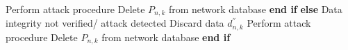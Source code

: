 \documentclass{llncs}
\begin{document}
\begin{enumerate}
\begin{algorithm}[!htbp]
\begin{algorithmic}[1]
    \State \hspace{20pt} Perform attack procedure
    \State \hspace{20pt} Delete $P_{n,k}$ from network database 
    \State \hspace{10pt} \textbf{end if}
    \State \textbf{else} 
    \State \hspace{10pt} Data integrity not verified/ attack detected
    \State \hspace{10pt} Discard data $d^{''}_{n,k}$
    \State \hspace{10pt} Perform attack procedure
    \State \hspace{10pt} Delete $P_{n,k}$ from network database
    \State \textbf{end if}
    \EndProcedure
    \end{algorithmic}
    \end{algorithm}

    
    

\end{enumerate}
\end{document}

